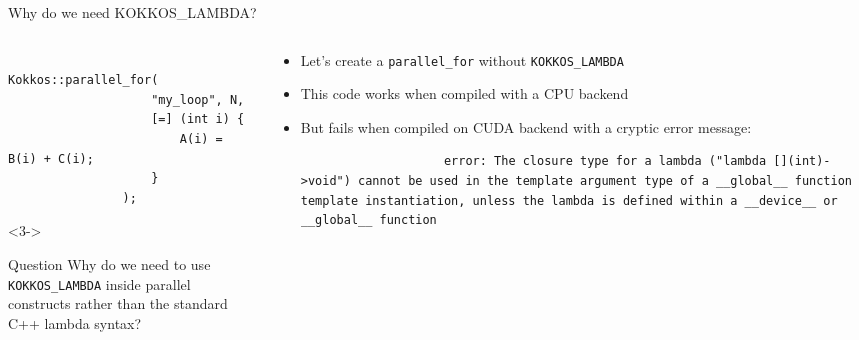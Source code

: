 \documentclass[
    aspectratio=169,
]{beamer}
\begin{document}
\begin{frame}[fragile]{Why do we need KOKKOS\_LAMBDA?}
    \begin{columns}
        \begin{column}{0.4\linewidth}
            \begin{verbatim}
                Kokkos::parallel_for(
                    "my_loop", N,
                    [=] (int i) {
                        A(i) = B(i) + C(i);
                    }
                );
            \end{verbatim}

            \begin{uncoverenv}<3->
                \begin{block}{Question}
                    Why do we need to use \texttt{KOKKOS\_LAMBDA} inside parallel constructs rather than the standard C++ lambda syntax?
                \end{block}
            \end{uncoverenv}
        \end{column}
        \begin{column}{0.6\linewidth}
            \begin{itemize}
                \item Let's create a \texttt{parallel\_for} without \texttt{KOKKOS\_LAMBDA}
                \item This code works when compiled with a CPU backend
                \pause
                \item But fails when compiled on CUDA backend with a cryptic error message:
                \begin{verbatim}
                    error: The closure type for a lambda ("lambda [](int)->void") cannot be used in the template argument type of a __global__ function template instantiation, unless the lambda is defined within a __device__ or __global__ function
                \end{verbatim}
            \end{itemize}
        \end{column}
    \end{columns}
\end{frame}
\end{document}
